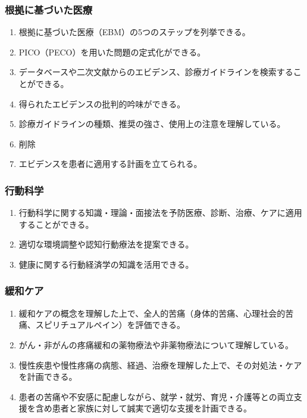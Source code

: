 \documentclass[
]{ltjsarticle}
\providecommand{\tightlist}{%
  \setlength{\itemsep}{0pt}\setlength{\parskip}{0pt}}
\begin{document}
\hypertarget{ux6839ux62e0ux306bux57faux3065ux3044ux305fux533bux7642}{%
\subsubsection{根拠に基づいた医療}\label{ux6839ux62e0ux306bux57faux3065ux3044ux305fux533bux7642}}

\begin{enumerate}
\def\labelenumi{\arabic{enumi}.}
\tightlist
\item
  根拠に基づいた医療（EBM）の5つのステップを列挙できる。
\item
  PICO（PECO）を用いた問題の定式化ができる。
\item
  データベースや二次文献からのエビデンス、診療ガイドラインを検索することができる。
\item
  得られたエビデンスの批判的吟味ができる。
\item
  診療ガイドラインの種類、推奨の強さ、使用上の注意を理解している。
\item
  削除
\item
  エビデンスを患者に適用する計画を立てられる。
\end{enumerate}

\hypertarget{ux884cux52d5ux79d1ux5b66}{%
\subsubsection{行動科学}\label{ux884cux52d5ux79d1ux5b66}}

\begin{enumerate}
\def\labelenumi{\arabic{enumi}.}
\tightlist
\item
  行動科学に関する知識・理論・面接法を予防医療、診断、治療、ケアに適用することができる。
\item
  適切な環境調整や認知行動療法を提案できる。
\item
  健康に関する行動経済学の知識を活用できる。
\end{enumerate}

\hypertarget{ux7de9ux548cux30b1ux30a2}{%
\subsubsection{緩和ケア}\label{ux7de9ux548cux30b1ux30a2}}

\begin{enumerate}
\def\labelenumi{\arabic{enumi}.}
\tightlist
\item
  緩和ケアの概念を理解した上で、全人的苦痛（身体的苦痛、心理社会的苦痛、スピリチュアルペイン）を評価できる。
\item
  がん・非がんの疼痛緩和の薬物療法や非薬物療法について理解している。
\item
  慢性疾患や慢性疼痛の病態、経過、治療を理解した上で、その対処法・ケアを計画できる。
\item
  患者の苦痛や不安感に配慮しながら、就学・就労、育児・介護等との両立支援を含め患者と家族に対して誠実で適切な支援を計画できる。
\end{enumerate}
\end{document}
